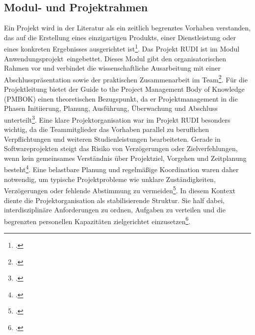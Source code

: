 \documentclass[12pt]{article}
\begin{document}
\subsection{Modul- und Projektrahmen}
Ein Projekt wird in der Literatur als ein zeitlich begrenztes Vorhaben verstanden, 
das auf die Erstellung eines einzigartigen Produkts, einer Dienstleistung oder 
eines konkreten Ergebnisses ausgerichtet ist\footcite[Vgl.][1--2]{couto-2022}. 
Das Projekt RUDI ist im Modul \glqq Anwendungsprojekt\grqq\ eingebettet. Dieses 
Modul gibt den organisatorischen Rahmen vor und verbindet die wissenschaftliche 
Ausarbeitung mit einer Abschlusspräsentation sowie der praktischen Zusammenarbeit 
im Team\footcite[Vgl.][4--9]{schnee-2026}. Für die Projektleitung bietet der 
Guide to the Project Management Body of Knowledge (PMBOK) einen theoretischen 
Bezugspunkt, da er Projektmanagement in die Phasen Initiierung, Planung, 
Ausführung, Überwachung und Abschluss unterteilt\footcite[Vgl.][2--3]{couto-2022}.
Eine klare Projektorganisation war im Projekt RUDI besonders wichtig, da die 
Teammitglieder das Vorhaben parallel zu beruflichen Verpflichtungen und weiteren 
Studienleistungen bearbeiteten. Gerade in Softwareprojekten steigt das Risiko von 
Verzögerungen oder Zielverfehlungen, wenn kein gemeinsames Verständnis über 
Projektziel, Vorgehen und Zeitplanung besteht\footcite[Vgl.][1--2]{bogopa-2022}. 
Eine belastbare Planung und regelmäßige Koordination waren daher notwendig, um 
typische Projektprobleme wie unklare Zuständigkeiten, Verzögerungen oder fehlende 
Abstimmung zu vermeiden\footcite[Vgl.][518--519]{sitnikov-2024}. In diesem 
Kontext diente die Projektorganisation als stabilisierende Struktur. Sie half 
dabei, interdisziplinäre Anforderungen zu ordnen, Aufgaben zu verteilen und die 
begrenzten personellen Kapazitäten zielgerichtet einzusetzen\footcite[Vgl.][522]{sitnikov-2024}.
\end{document}
